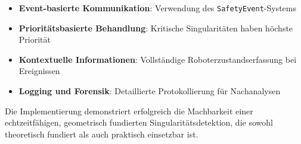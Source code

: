 \begin{itemize}
    \item \textbf{Event-basierte Kommunikation}: Verwendung des \texttt{SafetyEvent}-Systems
    \item \textbf{Prioritätsbasierte Behandlung}: Kritische Singularitäten haben höchste Priorität
    \item \textbf{Kontextuelle Informationen}: Vollständige Roboterzustandserfassung bei Ereignissen
    \item \textbf{Logging und Forensik}: Detaillierte Protokollierung für Nachanalysen
\end{itemize}

Die Implementierung demonstriert erfolgreich die Machbarkeit einer
echtzeitfähigen, geometrisch fundierten Singularitätsdetektion, die sowohl
theoretisch fundiert als auch praktisch einsetzbar ist.
